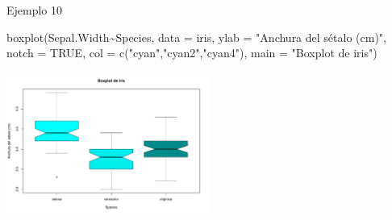 \documentclass[
  ignorenonframetext,
  aspectratio=169]{beamer}
\newenvironment{Shaded}{\begin{snugshade}}{\end{snugshade}}
\newcommand{\AttributeTok}[1]{\textcolor[rgb]{0.77,0.63,0.00}{#1}}
\newcommand{\ConstantTok}[1]{\textcolor[rgb]{0.00,0.00,0.00}{#1}}
\newcommand{\FunctionTok}[1]{\textcolor[rgb]{0.00,0.00,0.00}{#1}}
\newcommand{\NormalTok}[1]{#1}
\newcommand{\SpecialCharTok}[1]{\textcolor[rgb]{0.00,0.00,0.00}{#1}}
\newcommand{\StringTok}[1]{\textcolor[rgb]{0.31,0.60,0.02}{#1}}
\begin{document}
\begin{frame}[fragile]{Ejemplo 10}
\protect\hypertarget{ejemplo-10}{}
\begin{Shaded}
\begin{Highlighting}[]
\FunctionTok{boxplot}\NormalTok{(Sepal.Width}\SpecialCharTok{\textasciitilde{}}\NormalTok{Species, }\AttributeTok{data =}\NormalTok{ iris, }\AttributeTok{ylab =} \StringTok{"Anchura del sétalo (cm)"}\NormalTok{,}
        \AttributeTok{notch =} \ConstantTok{TRUE}\NormalTok{, }\AttributeTok{col =} \FunctionTok{c}\NormalTok{(}\StringTok{"cyan"}\NormalTok{,}\StringTok{"cyan2"}\NormalTok{,}\StringTok{"cyan4"}\NormalTok{),}
        \AttributeTok{main =} \StringTok{"Boxplot de iris"}\NormalTok{)}
\end{Highlighting}
\end{Shaded}

\begin{center}\includegraphics[width=250px]{Hora5_files/figure-beamer/unnamed-chunk-15-1} \end{center}
\end{frame}
\end{document}
